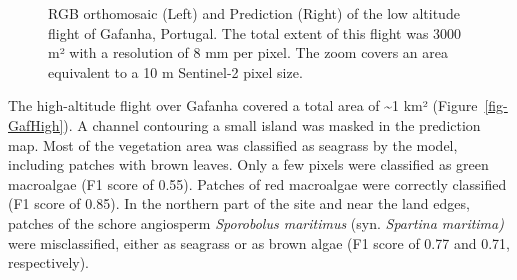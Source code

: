 \documentclass[
  letterpaper,
  11pt,
  english,
  singlespacing,
  headsepline]{MastersDoctoralThesis}
\begin{document}
\begin{spacing}{1.5}
\begin{figure}


\caption{\label{fig-GafLow}RGB orthomosaic (Left) and Prediction (Right)
of the low altitude flight of Gafanha, Portugal. The total extent of
this flight was 3000 m² with a resolution of 8 mm per pixel. The zoom
covers an area equivalent to a 10 m Sentinel-2 pixel size.}

\end{figure}%

The high-altitude flight over Gafanha covered a total area of
\textasciitilde1 km² (Figure~\ref{fig-GafHigh}). A channel contouring a
small island was masked in the prediction map. Most of the vegetation
area was classified as seagrass by the model, including patches with
brown leaves. Only a few pixels were classified as green macroalgae (F1
score of 0.55). Patches of red macroalgae were correctly classified (F1
score of 0.85). In the northern part of the site and near the land
edges, patches of the schore angiosperm \emph{Sporobolus maritimus}
(syn. \emph{Spartina maritima)} were misclassified, either as seagrass
or as brown algae (F1 score of 0.77 and 0.71, respectively).

\begin{figure}

\centering{

}
\end{figure}
\end{spacing}
\end{document}
